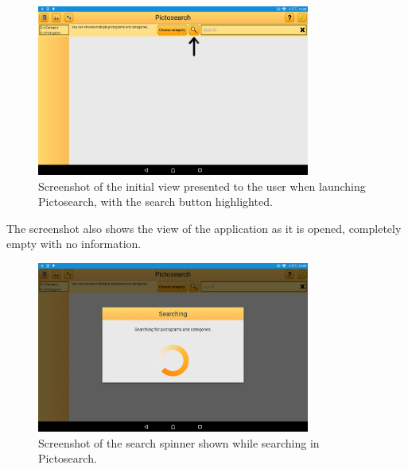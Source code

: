 \begin{figure}[ht]
    \centering
    \includegraphics[width=0.8\textwidth]{figures/img/screenshots/old_startup.png}
    \caption{Screenshot of the initial view presented to the user when launching Pictosearch, with the search button highlighted.}\label{fig:screenshot_startup}
\end{figure}
\noindent
The screenshot also shows the view of the application as it is opened, completely empty with no information.

\begin{figure}[ht]
    \centering
    \includegraphics[width=0.8\textwidth]{figures/img/screenshots/old_dialog.png}
    \caption{Screenshot of the search spinner shown while searching in Pictosearch.}\label{fig:screenshot_searchspinner}
\end{figure}

